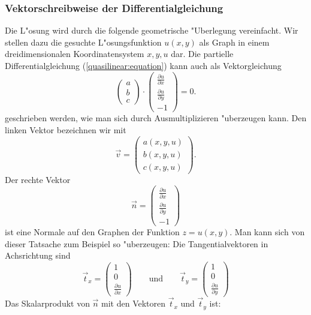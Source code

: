 \subsubsection{Vektorschreibweise der Differentialgleichung}
Die L"osung wird durch die folgende geometrische "Uberlegung vereinfacht.
Wir stellen dazu die gesuchte L"osungsfunktion $u(x,y)$ als Graph
in einem dreidimensionalen Koordinatensystem $x,y,u$ dar.
Die partielle Differentialgleichung (\ref{quasilinear:equation})
kann auch als Vektorgleichung
\begin{equation}
\begin{pmatrix}a\\b\\c\end{pmatrix}
\cdot
\begin{pmatrix}
\frac{\partial u}{\partial x}\\
\frac{\partial u}{\partial y}\\
-1
\end{pmatrix}
=0.
\label{quasilinear:vektorform}
\end{equation}
geschrieben werden, wie man sich durch Ausmultiplizieren "uberzeugen
kann.
Den linken Vektor bezeichnen wir mit
\[
\vec v=\begin{pmatrix}
a(x,y,u)\\
b(x,y,u)\\
c(x,y,u)
\end{pmatrix}.
\]
Der rechte Vektor
\[
\vec n=
\begin{pmatrix}
\frac{\partial u}{\partial x}\\
\frac{\partial u}{\partial y}\\
-1
\end{pmatrix}
\]
ist eine Normale auf den Graphen der Funktion
$z=u(x,y)$. Man kann sich von dieser Tatsache zum Beispiel so 
"uberzeugen: Die Tangentialvektoren in Achsrichtung sind
\[
\vec t_x
=
\begin{pmatrix}1\\0\\\frac{\partial u}{\partial x}\end{pmatrix}
\qquad
\text{und}
\qquad
\vec t_y
=
\begin{pmatrix}1\\0\\\frac{\partial u}{\partial y}\end{pmatrix}
\]
Das Skalarprodukt von $\vec n$ mit den Vektoren $\vec t_x$ und $\vec t_y$
ist:
